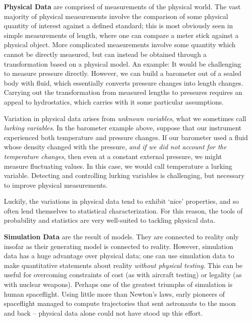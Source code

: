 \documentclass[../primer.tex]{subfiles}
\begin{document}
\textbf{Physical Data} are comprised of measurements of the physical world. The
vast majority of physical measurements involve the comparison of some physical
quantity of interest against a defined standard; this is most obviously seen in
simple measurements of length, where one can compare a meter stick against a
physical object. More complicated measurements involve some quantity which
cannot be directly measured, but can instead be obtained through a
transformation based on a physical model. An example: It would be challenging to
measure pressure directly. However, we can build a barometer out of a sealed
body with fluid, which essentially converts pressure changes into length
changes. Carrying out the transformation from measured lengths to pressures
requires an appeal to hydrostatics, which carries with it some particular
assumptions.

Variation in physical data arises from \emph{unknown variables}, what we
sometimes call \emph{lurking variables}.\cite{box1966} In the barometer example
above, suppose that our instrument experienced both temperature and pressure
changes. If our barometer used a fluid whose density changed with the pressure,
\emph{and if we did not account for the temperature changes}, then even at a
constant external pressure, we might measure fluctuating values. In this case,
we would call temperature a lurking variable. Detecting and controlling lurking
variables is challenging, but necessary to improve physical
measurements.\cite{joiner1981,delRosario2017lurking}

Luckily, the variations in physical data tend to exhibit `nice' properties, and
so often lend themselves to statistical characterization. For this reason, the
tools of probability and statistics are very well-suited to tackling physical
data.

\textbf{Simulation Data} are the result of models. They are connected to reality
only insofar as their generating model is connected to reality. However,
simulation data has a huge advantage over physical data; one can use simulation
data to make quantitative statements about reality \emph{without physical
  testing}. This can be useful for overcoming constraints of cost (as with
aircraft testing) or legality (as with nuclear weapons). Perhaps one of the
greatest triumphs of simulation is human spaceflight. Using little more than
Newton's laws, early pioneers of spaceflight managed to compute trajectories
that sent astronauts to the moon and back -- physical data alone could not have
stood up this effort.
\end{document}
